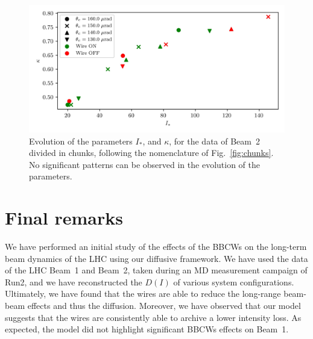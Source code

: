 \begin{figure}[hpt]
    \centering
    \includegraphics[width=1.0\textwidth]{5_wire_compensators_LHC/figs/fokker_planck_b2.jpg}
    \caption{Evolution of the parameters $I_\ast$, and $\kappa$, for the data of Beam~2 divided in chunks, following the nomenclature of Fig.~\ref{fig:chunks}. No significant patterns can be observed in the evolution of the parameters.}
    \label{fig:parameters_3}
\end{figure}


\section{Final remarks}

We have performed an initial study of the effects of the BBCWs on the long-term beam dynamics of the LHC using our diffusive framework. We have used the data of the LHC Beam~1 and Beam~2, taken during an MD measurement campaign of Run2, and we have reconstructed the $D(I)$ of various system configurations. Ultimately, we have found that the wires are able to reduce the long-range beam-beam effects and thus the diffusion. Moreover, we have observed that our model suggests that the wires are consistently able to archive a lower intensity loss. As expected, the model did not highlight significant BBCWs effects on Beam~1.


